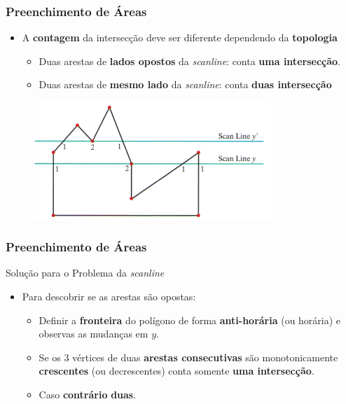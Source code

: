 \documentclass{beamer}
\begin{document}
\begin{frame}
\frametitle{Preenchimento de Áreas}

	\begin{block}{}
		\begin{itemize}
			\item A \textbf{contagem} da intersecção deve ser diferente dependendo da \textbf{topologia}
			\begin{itemize}
				\item Duas arestas de \textbf{lados opostos} da \textit{scanline}: conta \textbf{uma intersecção}.
				\item Duas arestas de \textbf{mesmo lado} da \textit{scanline}: conta \textbf{duas intersecção}
			\end{itemize}
		\end{itemize}
	\end{block}

		\begin{figure}[!h]
			\begin{center}
				\includegraphics[width=0.8\textwidth]{Figures/ScaLinPro}
			\end{center}
		\end{figure}
	
\end{frame}

\begin{frame}
\frametitle{Preenchimento de Áreas}

	\begin{block}{Solução para o Problema da \textit{scanline}}
		\begin{itemize}
			\item Para descobrir se as arestas são opostas:
			\begin{itemize}
				\item Definir a \textbf{fronteira} do polígono de forma \textbf{anti-horária} (ou horária) e observas as mudanças em $y$.
				\item Se os 3 vértices de duas \textbf{arestas consecutivas} são monotonicamente \textbf{crescentes} (ou decrescentes) conta somente \textbf{uma intersecção}.
				\item Caso \textbf{contrário} \textbf{duas}.
			\end{itemize}
		\end{itemize}
	\end{block}
	
\end{frame}
\end{document}
